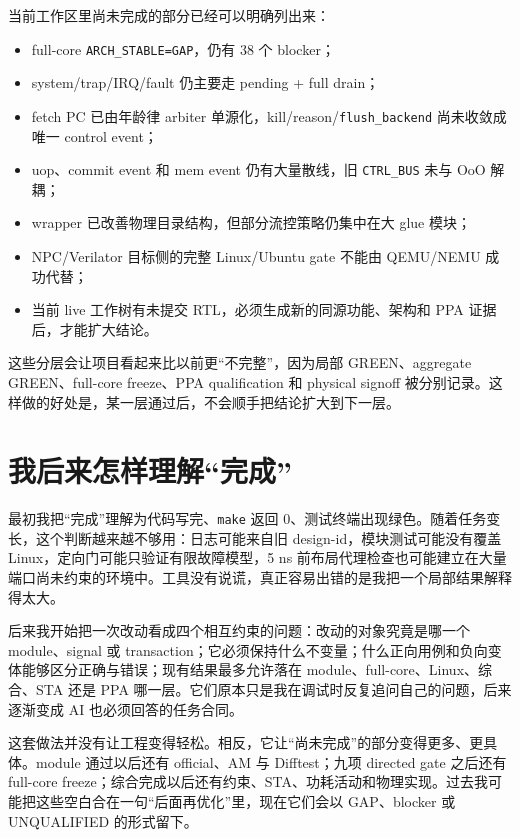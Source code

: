 \documentclass[UTF8,a4paper,zihao=-4,oneside]{ctexart}
\newcommand{\statusword}[1]{\texttt{#1}}
\begin{document}
当前工作区里尚未完成的部分已经可以明确列出来：

\begin{itemize}
  \item full-core \statusword{ARCH\_STABLE=GAP}，仍有 38 个 blocker；
  \item system/trap/IRQ/fault 仍主要走 pending + full drain；
  \item fetch PC 已由年龄律 arbiter 单源化，kill/reason/\texttt{flush\_backend} 尚未收敛成唯一 control event；
  \item uop、commit event 和 mem event 仍有大量散线，旧 \texttt{CTRL\_BUS} 未与 OoO 解耦；
  \item wrapper 已改善物理目录结构，但部分流控策略仍集中在大 glue 模块；
  \item NPC/Verilator 目标侧的完整 Linux/Ubuntu gate 不能由 QEMU/NEMU 成功代替；
  \item 当前 live 工作树有未提交 RTL，必须生成新的同源功能、架构和 PPA 证据后，才能扩大结论。
\end{itemize}

这些分层会让项目看起来比以前更“不完整”，因为局部 GREEN、aggregate GREEN、full-core freeze、PPA qualification 和 physical signoff 被分别记录。这样做的好处是，某一层通过后，不会顺手把结论扩大到下一层。

\section{我后来怎样理解“完成”}

最初我把“完成”理解为代码写完、\texttt{make} 返回 0、测试终端出现绿色。随着任务变长，这个判断越来越不够用：日志可能来自旧 design-id，模块测试可能没有覆盖 Linux，定向门可能只验证有限故障模型，5 ns 前布局代理检查也可能建立在大量端口尚未约束的环境中。工具没有说谎，真正容易出错的是我把一个局部结果解释得太大。

后来我开始把一次改动看成四个相互约束的问题：改动的对象究竟是哪一个 module、signal 或 transaction；它必须保持什么不变量；什么正向用例和负向变体能够区分正确与错误；现有结果最多允许落在 module、full-core、Linux、综合、STA 还是 PPA 哪一层。它们原本只是我在调试时反复追问自己的问题，后来逐渐变成 AI 也必须回答的任务合同。

这套做法并没有让工程变得轻松。相反，它让“尚未完成”的部分变得更多、更具体。module 通过以后还有 official、AM 与 Difftest；九项 directed gate 之后还有 full-core freeze；综合完成以后还有约束、STA、功耗活动和物理实现。过去我可能把这些空白合在一句“后面再优化”里，现在它们会以 GAP、blocker 或 UNQUALIFIED 的形式留下。
\end{document}
